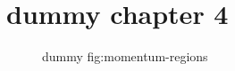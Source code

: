 \clearpage\begingroup\small
\setcounter{chapter}{4}\addtocounter{chapter}{-1}
\chapter{dummy chapter 4}
\begin{figure}[h]\centering{}\caption{dummy fig:momentum-regions}\label{fig:momentum-regions}\end{figure}
\endgroup
